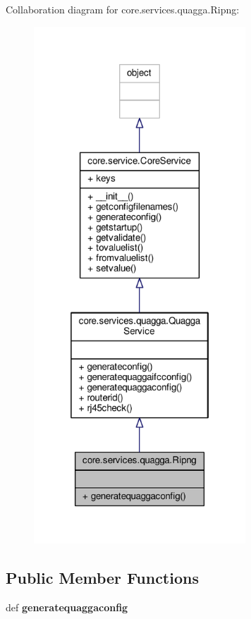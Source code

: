 Collaboration diagram for core.\+services.\+quagga.\+Ripng\+:
\nopagebreak
\begin{figure}[H]
\begin{center}
\leavevmode
\includegraphics[height=550pt]{classcore_1_1services_1_1quagga_1_1_ripng__coll__graph}
\end{center}
\end{figure}
\subsection*{Public Member Functions}
\begin{DoxyCompactItemize}
\item 
\hypertarget{classcore_1_1services_1_1quagga_1_1_ripng_aad83ff244b2089d888fd04b778cdb07a}{def {\bfseries generatequaggaconfig}}\label{classcore_1_1services_1_1quagga_1_1_ripng_aad83ff244b2089d888fd04b778cdb07a}

\end{DoxyCompactItemize}
